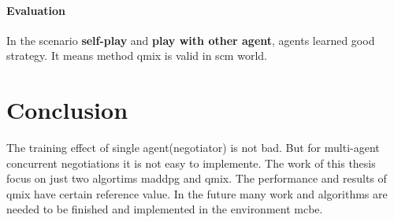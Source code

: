 \paragraph{Evaluation} In the scenario \textbf{self-play} and \textbf{play with other agent}, agents learned good strategy. It means method \gls{qmix} is valid in \gls{scm} world.


\section{Conclusion}
The training effect of single agent(negotiator) is not bad. But for multi-agent concurrent negotiations it is not easy to implemente. The work of this thesis focus on just two algortims \gls{maddpg} and \gls{qmix}. The performance and results of \gls{qmix} have certain reference value. In the future many work and algorithms are needed to be finished and implemented in the environment \gls{mcbe}.